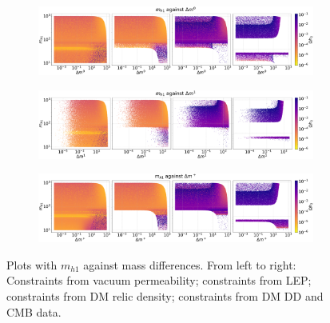 \documentclass[12pt]{article}
\begin{document}
\begin{figure}[H]
    \begin{subfigure}[b]{\columnwidth}
      \centering
      \includegraphics[width=1\columnwidth]{4plot/MD1_DM2.pdf}
    \end{subfigure}
    
    \begin{subfigure}[b]{\columnwidth}
      \centering
      \includegraphics[width=1\columnwidth]{4plot/MD1_DM3.pdf}
    \end{subfigure}

    \begin{subfigure}[b]{\columnwidth}
      \centering
      \includegraphics[width=1\columnwidth]{4plot/MD1_DMP.pdf}
    \end{subfigure}
    \caption{Plots with $m_{h1}$ against mass differences. From left to right: Constraints from vacuum permeability; constraints from LEP; constraints from DM relic density; constraints from DM DD and CMB data.}
\end{figure}
\end{document}
